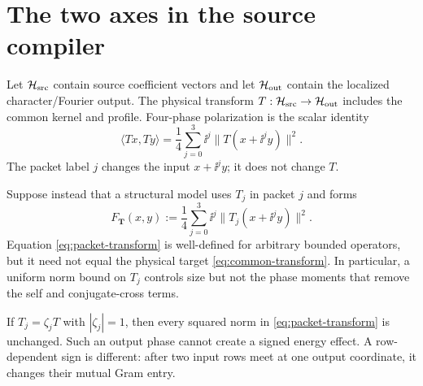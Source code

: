 \section{The two axes in the source compiler}

Let $\mathcal H_{\rm src}$ contain source coefficient vectors and let $\mathcal H_{\rm out}$ contain the localized
character/Fourier output.  The physical transform $T:\mathcal H_{\rm src}\to\mathcal H_{\rm out}$ includes the
common kernel and profile.  Four-phase polarization is the scalar identity
\begin{equation}
 \langle Tx,Ty\rangle
 =\frac14\sum_{j=0}^3\ii^j\|T(x+\ii^jy)\|^2.
 \label{eq:common-transform}
\end{equation}
The packet label $j$ changes the input $x+\ii^j y$; it does not change $T$.

Suppose instead that a structural model uses $T_j$ in packet $j$ and forms
\begin{equation}
 F_{\boldsymbol T}(x,y)
 :=\frac14\sum_{j=0}^3\ii^j\|T_j(x+\ii^jy)\|^2.
 \label{eq:packet-transform}
\end{equation}
Equation \eqref{eq:packet-transform} is well-defined for arbitrary bounded operators,
but it need not equal the physical target \eqref{eq:common-transform}.  In particular,
a uniform norm bound on $T_j$ controls size but not the phase moments that remove the
self and conjugate-cross terms.

\begin{remark}
If $T_j=\zeta_jT$ with $|\zeta_j|=1$, then every squared norm in
\eqref{eq:packet-transform} is unchanged.  Such an output phase cannot create a signed
energy effect.  A row-dependent sign is different: after two input rows meet at one
output coordinate, it changes their mutual Gram entry.
\end{remark}
